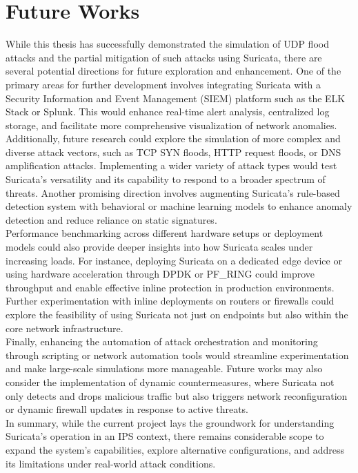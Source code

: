 \section{Future Works}
While this thesis has successfully demonstrated the simulation of UDP flood attacks and the partial mitigation of such attacks using Suricata, there are several potential directions for future exploration and enhancement. One of the primary areas for further development involves integrating Suricata with a Security Information and Event Management (SIEM) platform such as the ELK Stack or Splunk. This would enhance real-time alert analysis, centralized log storage, and facilitate more comprehensive visualization of network anomalies.
\\
Additionally, future research could explore the simulation of more complex and diverse attack vectors, such as TCP SYN floods, HTTP request floods, or DNS amplification attacks. Implementing a wider variety of attack types would test Suricata’s versatility and its capability to respond to a broader spectrum of threats. Another promising direction involves augmenting Suricata’s rule-based detection system with behavioral or machine learning models to enhance anomaly detection and reduce reliance on static signatures.
\\
Performance benchmarking across different hardware setups or deployment models could also provide deeper insights into how Suricata scales under increasing loads. For instance, deploying Suricata on a dedicated edge device or using hardware acceleration through DPDK or PF\_RING could improve throughput and enable effective inline protection in production environments. Further experimentation with inline deployments on routers or firewalls could explore the feasibility of using Suricata not just on endpoints but also within the core network infrastructure.
\\
Finally, enhancing the automation of attack orchestration and monitoring through scripting or network automation tools would streamline experimentation and make large-scale simulations more manageable. Future works may also consider the implementation of dynamic countermeasures, where Suricata not only detects and drops malicious traffic but also triggers network reconfiguration or dynamic firewall updates in response to active threats.
\\
In summary, while the current project lays the groundwork for understanding Suricata’s operation in an IPS context, there remains considerable scope to expand the system’s capabilities, explore alternative configurations, and address its limitations under real-world attack conditions.